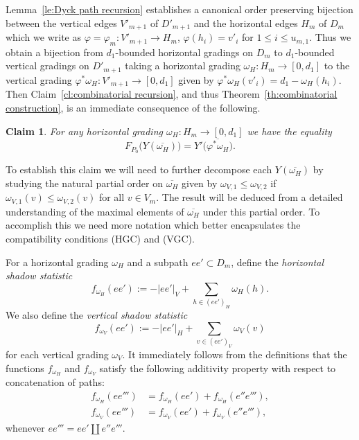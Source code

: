 \documentclass{amsart}
\newtheorem{claim}[theorem]{Claim}
\begin{document}
Lemma~\ref{le:Dyck path recursion} establishes a canonical order preserving bijection between the vertical edges $V'_{m+1}$ of $D'_{m+1}$ and the horizontal edges $H_m$ of $D_m$ which we write as $\varphi=\varphi_m:V'_{m+1}\to H_m$, $\varphi(h_i)=v'_i$ for $1\le i\le u_{m,1}$.  Thus we obtain a bijection from $d_1$-bounded horizontal gradings on $D_m$ to $d_1$-bounded vertical gradings on $D'_{m+1}$ taking a horizontal grading $\omega_H:H_m\to[0,d_1]$ to the vertical grading $\varphi^*\omega_H:V'_{m+1}\to[0,d_1]$ given by $\varphi^*\omega_H(v'_i)=d_1-\omega_H(h_i)$.  Then Claim~\ref{cl:combinatorial recursion}, and thus Theorem~\ref{th:combinatorial construction}, is an immediate consequence of the following.
\begin{claim}\label{cl:horizontal to vertical}
  For any horizontal grading $\omega_H:H_m\to[0,d_1]$ we have the equality
  \begin{equation}\label{eq:horizontal to vertical}
    F_{P_0}\big(Y(\overline{\omega_H})\big)=Y'\big(\overline{\varphi^*\omega_H}\big).
  \end{equation}
\end{claim}
To establish this claim we will need to further decompose each $Y(\overline{\omega_H})$ by studying the natural partial order on $\overline{\omega_H}$ given by $\omega_{V,1}\le\omega_{V,2}$ if $\omega_{V,1}(v)\le\omega_{V,2}(v)$ for all $v\in V_m$.  The result will be deduced from a detailed understanding of the maximal elements of $\overline{\omega_H}$ under this partial order.  To accomplish this we need more notation which better encapsulates the compatibility conditions (HGC) and (VGC).

For a horizontal grading $\omega_H$ and a subpath $ee'\subset D_m$, define the \emph{horizontal shadow statistic}
\[f_{\omega_H}(ee'):=-|ee'|_V+\sum\limits_{h\in(ee')_H}\omega_H(h).\]
We also define the \emph{vertical shadow statistic}
\[f_{\omega_V}(ee'):=-|ee'|_H+\sum\limits_{v\in(ee')_V}\omega_V(v)\]
for each vertical grading $\omega_V$.  It immediately follows from the definitions that the functions $f_{\omega_H}$ and $f_{\omega_V}$ satisfy the following additivity property with respect to concatenation of paths:
\begin{align*}
  f_{\omega_H}(ee''')&=f_{\omega_H}(ee')+f_{\omega_H}(e''e'''),\\
  f_{\omega_V}(ee''')&=f_{\omega_V}(ee')+f_{\omega_V}(e''e'''),
\end{align*}
whenever $ee'''=ee'\amalg e''e'''$.
\end{document}
